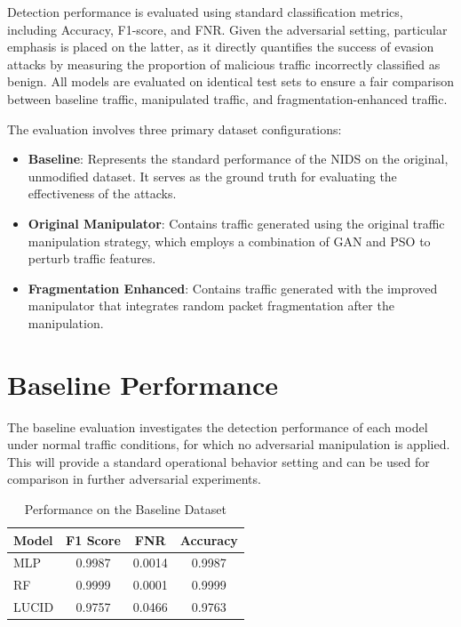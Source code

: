 Detection performance is evaluated using standard classification metrics, including Accuracy, F1-score, and FNR.
Given the adversarial setting, particular emphasis is placed on the latter, as it directly quantifies the success of evasion attacks by measuring the proportion of malicious traffic incorrectly classified as benign.
All models are evaluated on identical test sets to ensure a fair comparison between baseline traffic, manipulated traffic, and fragmentation-enhanced traffic.

The evaluation involves three primary dataset configurations:
\begin{itemize}
    \item \textbf{Baseline}: Represents the standard performance of the NIDS on the original, unmodified dataset. It serves as the ground truth for evaluating the effectiveness of the attacks.
    \item \textbf{Original Manipulator}: Contains traffic generated using the original traffic manipulation strategy, which employs a combination of GAN and PSO to perturb traffic features.
    \item \textbf{Fragmentation Enhanced}: Contains traffic generated with the improved manipulator that integrates random packet fragmentation after the manipulation.
\end{itemize}

\section{Baseline Performance}

The baseline evaluation investigates the detection performance of each model under normal traffic conditions, for which no adversarial manipulation is applied.
This will provide a standard operational behavior setting and can be used for comparison in further adversarial experiments.

\begin{table}[h]
\centering
\begin{tabular}{lccc}
\hline
Model & F1 Score & FNR & Accuracy \\
\hline
MLP   & 0.9987 & 0.0014 & 0.9987 \\
RF    & 0.9999 & 0.0001 & 0.9999 \\
LUCID & 0.9757 & 0.0466 & 0.9763 \\
\hline
\end{tabular}
\caption{Performance on the Baseline Dataset}
\label{tab:baseline}
\end{table}


